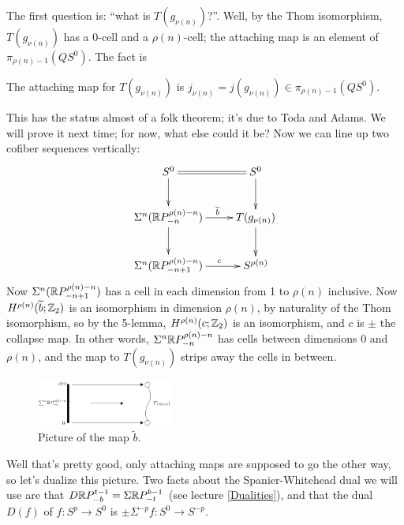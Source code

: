 The first question is: ``what is $T(g_{\nu(n)})$?''.  Well, by the Thom isomorphism, $T(g_{\nu(n)})$ has a 0-cell and a $\rho(n)$-cell; the attaching map is an element of $\pi_{\rho(n)-1} (Q S^0)$.  The fact is
\begin{thm}
The attaching map for $T(g_{\nu(n)})$ is $j_{\nu(n)} = j(g_{\nu(n)}) \in \pi_{\rho(n)-1}(QS^0)$.
\end{thm}
This has the status almost of a folk theorem; it's due to Toda and Adams.  We will prove it next time; for now, what else could it be?  Now we can line up two cofiber sequences vertically:
\[\xymatrix{S^0\ar[d]\ar@{=}[r]&S^0\ar[d]\\
\ar[d]\Suspend^n(\RP^{\rho(n)-n}_{-n}) \ar[r]^{\ \ \ \widetilde b}& T(g_{\nu(n)})\ar[d]\\
\Suspend^n (\RP^{\rho(n)-n}_{-n+1}) \ar[r]^{\ \ \ \ c} & S^{\rho(n)}
}\]
Now $\Sigma^n (\mathbb{R} P^{\rho(n)-n}_{-n+1})$ has a cell in each dimension from 1 to $\rho(n)$ inclusive. Now $H^{\rho(n)}(\widetilde b;\mathbb{Z}_2)$ is an isomorphism in dimension $\rho(n)$, by naturality of the Thom isomorphism,  so by the 5-lemma, $H^{\rho(n)}(c;\mathbb{Z}_2)$ is an isomorphism, and $c$ is $\pm$ the collapse map.
In other words, $\Sigma^n \mathbb{R} P^{\rho(n)-n}_{-n}$ has cells between dimensions $0$ and $\rho(n)$, and the map to $T(g_{\nu(n)})$ strips away the cells in between.
\begin{figure}[h!]
\centering\includegraphics[width=0.4\textwidth]{figures/figure30.pdf}
\caption{\small Picture of the map $\widetilde b$.}
\end{figure}

Well that's pretty good, only attaching maps are supposed to go the other way, so let's dualize this picture.  Two facts about the Spanier-Whitehead dual we will use are that $D \mathbb{R} P^{t-1}_{-b} = \Sigma \mathbb{R} P^{b-1}_{-t}$ (see lecture \ref{Dualities}), and that the dual $D(f)$ of $f:S^p\to S^0$ is $\pm\Sigma^{-p}f:S^0\to S^{-p}$.

